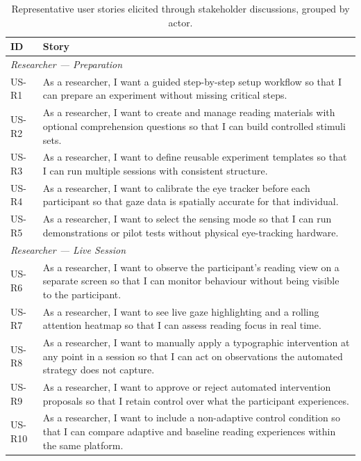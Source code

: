 \begin{table}[htbp]
\small
\centering
\caption{%
Representative user stories elicited through stakeholder discussions,
grouped by actor.%
}
\label{tab:us}
\begin{tabularx}{\linewidth}{@{} l X @{}}
\toprule
\textbf{ID} & \textbf{Story} \\
\midrule
\multicolumn{2}{l}{\textit{Researcher --- Preparation}} \\
\midrule
US-R1  & As a researcher, I want a guided step-by-step setup workflow so that I can prepare an experiment without missing critical steps. \\[2pt]
US-R2  & As a researcher, I want to create and manage reading materials with optional comprehension questions so that I can build controlled stimuli sets. \\[2pt]
US-R3  & As a researcher, I want to define reusable experiment templates so that I can run multiple sessions with consistent structure. \\[2pt]
US-R4  & As a researcher, I want to calibrate the eye tracker before each participant so that gaze data is spatially accurate for that individual. \\[2pt]
US-R5  & As a researcher, I want to select the sensing mode so that I can run demonstrations or pilot tests without physical eye-tracking hardware. \\
\midrule
\multicolumn{2}{l}{\textit{Researcher --- Live Session}} \\
\midrule
US-R6  & As a researcher, I want to observe the participant's reading view on a separate screen so that I can monitor behaviour without being visible to the participant. \\[2pt]
US-R7  & As a researcher, I want to see live gaze highlighting and a rolling attention heatmap so that I can assess reading focus in real time. \\[2pt]
US-R8  & As a researcher, I want to manually apply a typographic intervention at any point in a session so that I can act on observations the automated strategy does not capture. \\[2pt]
US-R9  & As a researcher, I want to approve or reject automated intervention proposals so that I retain control over what the participant experiences. \\[2pt]
US-R10 & As a researcher, I want to include a non-adaptive control condition so that I can compare adaptive and baseline reading experiences within the same platform. \\[2pt]

\end{tabularx}
\end{table}
